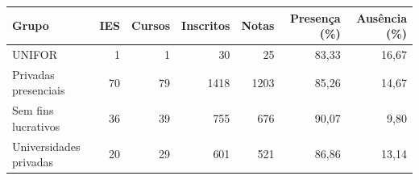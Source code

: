 \begin{tabular}{lrrrrrr}
\toprule
Grupo & IES & Cursos & Inscritos & Notas & Presença (\%) & Ausência (\%) \\
\midrule
UNIFOR & 1 & 1 & 30 & 25 & 83,33 & 16,67 \\
Privadas presenciais & 70 & 79 & 1418 & 1203 & 85,26 & 14,67 \\
Sem fins lucrativos & 36 & 39 & 755 & 676 & 90,07 & 9,80 \\
Universidades privadas & 20 & 29 & 601 & 521 & 86,86 & 13,14 \\
\bottomrule
\end{tabular}
